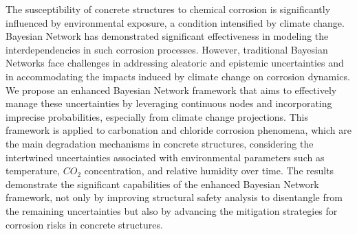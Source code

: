 The susceptibility of concrete structures to chemical corrosion is significantly influenced by environmental exposure, a condition intensified by climate change. 
Bayesian Network has demonstrated significant effectiveness in modeling the interdependencies in such corrosion processes. However, traditional Bayesian Networks face challenges in addressing aleatoric and epistemic uncertainties and in accommodating the impacts induced by climate change on corrosion dynamics. We propose an enhanced Bayesian Network framework that aims to effectively manage these uncertainties by leveraging continuous nodes and incorporating imprecise probabilities, especially from climate change projections. This framework is applied to carbonation and chloride corrosion phenomena, which are the main degradation mechanisms in concrete structures, considering the intertwined uncertainties associated with environmental parameters such as temperature, $CO_2$ concentration, and relative humidity over time. The results demonstrate the significant capabilities of the enhanced Bayesian Network framework, not only by improving structural safety analysis to disentangle from the remaining uncertainties but also by advancing the mitigation strategies for corrosion risks in concrete structures.
